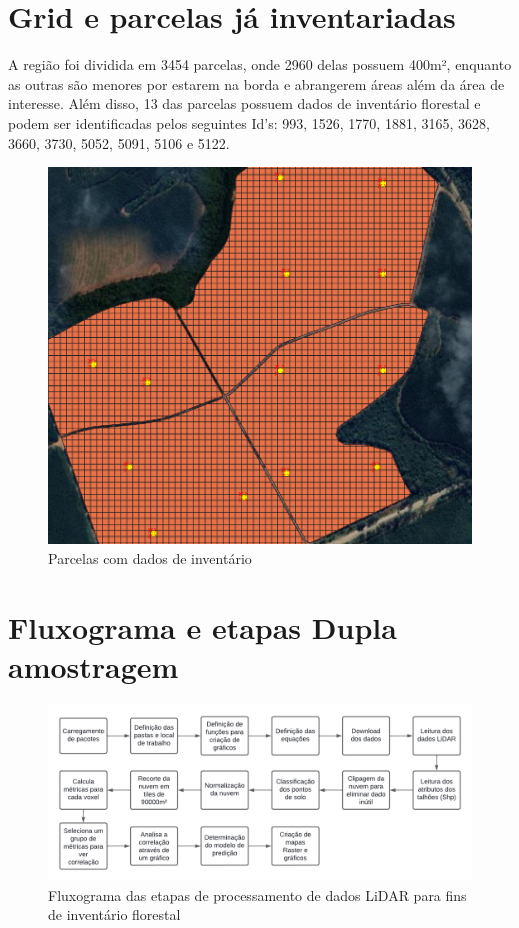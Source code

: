 \documentclass[
]{article}
\begin{document}
\newpage

\section{Grid e parcelas já
inventariadas}\label{grid-e-parcelas-juxe1-inventariadas}

A região foi dividida em 3454 parcelas, onde 2960 delas possuem 400m²,
enquanto as outras são menores por estarem na borda e abrangerem áreas
além da área de interesse. Além disso, 13 das parcelas possuem dados de
inventário florestal e podem ser identificadas pelos seguintes Id's:
993, 1526, 1770, 1881, 3165, 3628, 3660, 3730, 5052, 5091, 5106 e 5122.

\begin{figure}

{\centering \includegraphics[width=0.4\linewidth]{IMAGES/parcelasinventariadas} 

}

\caption{Parcelas com dados de inventário}\label{fig:unnamed-chunk-5}
\end{figure}
\newpage

\section{Fluxograma e etapas Dupla
amostragem}\label{fluxograma-e-etapas-dupla-amostragem}

\begin{figure}

{\centering \includegraphics[width=0.8\linewidth]{IMAGES/fluxogramaDA} 

}

\caption{Fluxograma das etapas de processamento de dados LiDAR para fins de inventário florestal}\label{fig:unnamed-chunk-6}
\end{figure}
\end{document}
